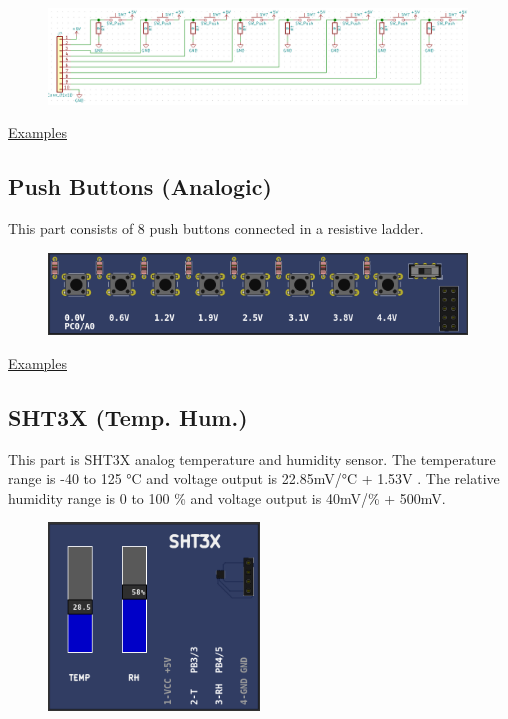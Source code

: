 \begin{figure}[H]
\center
\includegraphics[width=0.99\textwidth]{img/part_buttons_.png} 
\end{figure} 

\href{https://lcgamboa.github.io/picsimlab_examples/parts_Push_Buttons.html}{Examples}


\subsection{Push Buttons (Analogic)}


This part consists of 8 push buttons connected in a resistive ladder.

\begin{figure}[H]
\center
\includegraphics[width=0.99\textwidth]{img/part_push_a.png} 
\end{figure}

\href{https://lcgamboa.github.io/picsimlab_examples/parts_Push_Buttons_(Analogic).html}{Examples}

\subsection{SHT3X (Temp. Hum.)}

This part is SHT3X analog temperature and humidity sensor. The temperature  range is -40 to 125 °C  and 
voltage output is 22.85mV/°C + 1.53V . The relative humidity range is 0 to 100 \%  and voltage output is 40mV/\% + 500mV.

\begin{figure}[H]
\center
\includegraphics[width=0.5\textwidth]{img/part_sht3x.png} 
\end{figure} 


